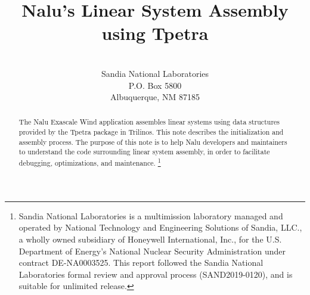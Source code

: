 \documentclass[12pt,report,strict,blank]{SANDreport}
\title{Nalu's Linear System Assembly using Tpetra}
\author{
  \ManualAuthorsList \\
  Sandia National Laboratories \\
  P.O. Box 5800 \\
  Albuquerque, NM 87185
}
\date{\ManualDate}
\begin{document}
\maketitle

\begin{abstract}

  The Nalu Exascale Wind application assembles linear systems using data
  structures provided by the Tpetra package in Trilinos. This note describes
  the initialization and assembly process. The purpose of this note is to help
  Nalu developers and maintainers to understand the code surrounding linear
  system assembly, in order to facilitate debugging, optimizations, and
  maintenance.
  \footnote{Sandia National 
  Laboratories is a multimission laboratory managed and operated by National Technology 
  and Engineering Solutions of Sandia, LLC., a wholly owned subsidiary of Honeywell 
  International, Inc., for the U.S. Department of Energy's National Nuclear Security 
  Administration under contract DE-NA0003525. This report followed the Sandia National 
  Laboratories formal review and approval process (SAND2019-0120), 
  and is suitable for unlimited release.}

\end{abstract}
\cleardoublepage
\tableofcontents
\SANDmain
%







\begin{raggedright}
\begin{footnotesize}
\printindex
\end{footnotesize}
\end{raggedright}
%

%
%
\begin{SANDdistribution}[NM]%




\end{SANDdistribution}
\end{document}
